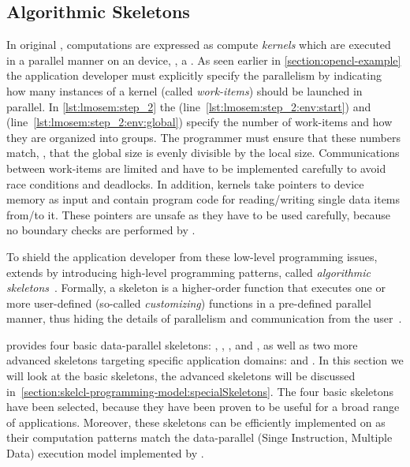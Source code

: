 \subsection{Algorithmic Skeletons}
\label{section:skelcl-programming-model:skeletons}
In original \OpenCL, computations are expressed as compute \emph{kernels} which are executed in a parallel manner on an \OpenCL device, \eg, a \GPU.
As seen earlier in \autoref{section:opencl-example} the application developer must explicitly specify the parallelism by indicating how many instances of a kernel (called \emph{work-items}) should be launched in parallel.
In \autoref{lst:lmosem:step_2} the  (line~\ref{lst:lmosem:step_2:env:start}) and  (line~\ref{lst:lmosem:step_2:env:global}) specify the number of work-items and how they are organized into groups.
The programmer must ensure that these numbers match, \ie, that the global size is evenly divisible by the local size.
Communications between work-items are limited and have to be implemented carefully to avoid race conditions and deadlocks.
In addition, kernels take pointers to device memory as input and contain program code for reading/writing single data items from/to it.
These pointers are unsafe as they have to be used carefully, because no boundary checks are performed by \OpenCL.

To shield the application developer from these low-level programming issues, \SkelCL extends \OpenCL by introducing high-level programming patterns, called \emph{algorithmic skeletons}~\cite{Cole1991}.
Formally, a skeleton is a higher-order function that executes one or more user-defined (so-called \emph{customizing}) functions in a pre-defined parallel manner, thus hiding the details of parallelism and communication from the user~\cite{GorlatchCo2011}.

\SkelCL provides four basic data-parallel skeletons: \map, \zip, \reduce, and \scan,
as well as two more advanced skeletons targeting specific application domains: \stencil and \allpairs.
In this section we will look at the basic skeletons, the advanced skeletons will be discussed in~\autoref{section:skelcl-programming-model:specialSkeletons}.
The four basic skeletons have been selected, because they have been proven to be useful for a broad range of applications.
Moreover, these skeletons can be efficiently implemented on \GPUs as their computation patterns match the data-parallel \SIMD (Singe Instruction, Multiple Data) execution model implemented by \GPUs.

